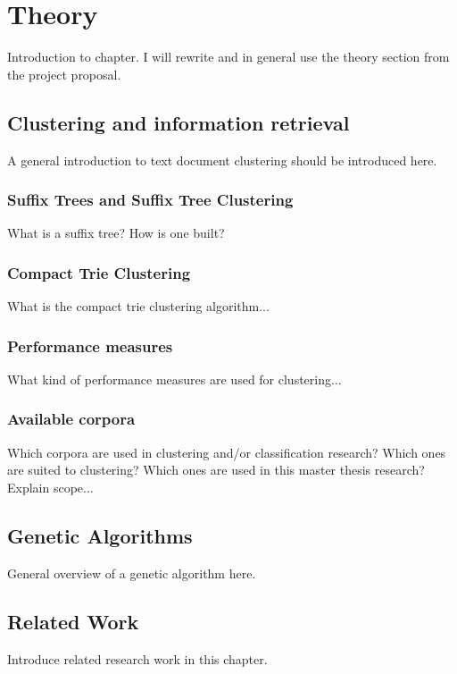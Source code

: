 
\chapter{Theory} %
\label{Theory} %

Introduction to chapter. I will rewrite and in general use the theory section from the project proposal.

\section{Clustering and information retrieval}
\label{Clustering}
A general introduction to text document clustering should be introduced here.

\subsection{Suffix Trees and Suffix Tree Clustering}
What is a suffix tree? How is one built?

\subsection{Compact Trie Clustering}
What is the compact trie clustering algorithm...

\subsection{Performance measures}
What kind of performance measures are used for clustering...

\subsection{Available corpora}
Which corpora are used in clustering and/or classification research? Which ones are suited to clustering? Which ones are used in this master thesis research? Explain scope...


\section{Genetic Algorithms}
\label{GeneticAlgorithm}
General overview of a genetic algorithm here.


\section{Related Work}
\label{RelatedWork}
Introduce related research work in this chapter.